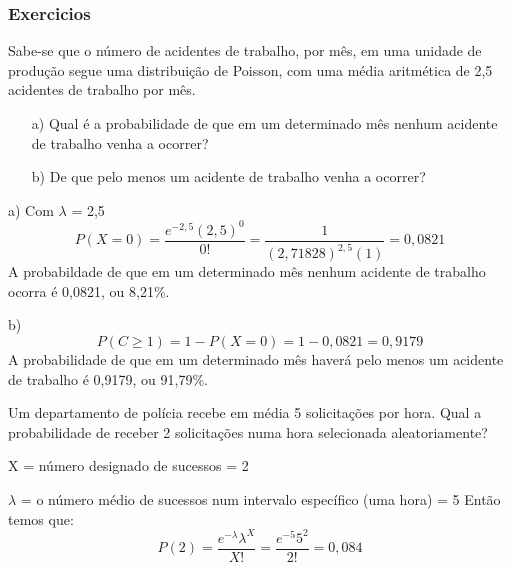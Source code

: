 \documentclass[10pt,a4paper]{article}
\begin{document}
\subsubsection{Exercicios}
\begin{ex}
	Sabe-se que o número de acidentes de trabalho, por mês, em uma unidade de produção segue uma distribuição de Poisson, com uma média aritmética de 2,5  acidentes de trabalho por mês.
	\begin{itemize}
		\item[a)] Qual é a probabilidade de que em um determinado mês nenhum acidente de trabalho venha a ocorrer?
		\item[b)] De que pelo menos um acidente de trabalho venha a ocorrer?
	\end{itemize}
\end{ex}

\begin{sol}
	a) Com $\lambda$ = 2,5
	\[
		P(X = 0) = \frac{e^{-2,5}(2,5)^{0}}{0!} = \frac{1}{(2,71828)^{2,5}(1)} = 0,0821
	\]
	A probabildade de que em um determinado mês nenhum acidente de trabalho ocorra é 0,0821,  ou 8,21\%.
	
	
	b) 
	\[
		P(C \geq 1) = 1 - P(X = 0) = 1 - 0,0821 = 0,9179
	\]
	A probabilidade de que em um determinado mês haverá pelo menos um acidente de trabalho é  0,9179, ou 91,79\%.
\end{sol}

\begin{ex}
	Um departamento de polícia recebe em média 5 solicitações por hora.  Qual  a  probabilidade  de  receber  2 solicitações numa hora selecionada aleatoriamente? 
\end{ex}
\begin{sol}
	X = número designado de sucessos = 2 
	
	$\lambda$ = o número médio de sucessos num intervalo específico (uma hora) = 5 
	Então temos que:
	\[P(2) = \frac{e^{-\lambda}\lambda^{X}}{X!}	= \frac{e^{-5}5^{2}}{2!} = 0,084\]
\end{sol}
\end{document}
